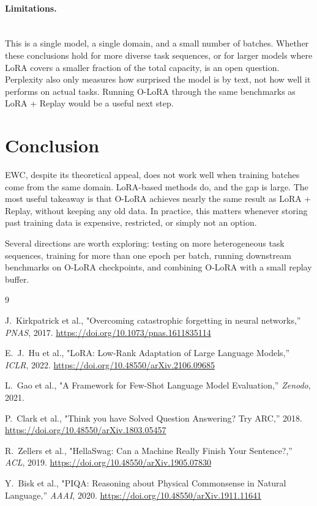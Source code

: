 \documentclass[11pt,a4paper]{article}
\begin{document}
\paragraph{Limitations.}\mbox{}\\
This is a single model, a single domain, and a small number of batches. Whether these conclusions hold for more diverse task sequences, or for larger models where LoRA covers a smaller fraction of the total capacity, is an open question. Perplexity also only measures how surprised the model is by text, not how well it performs on actual tasks. Running O-LoRA through the same benchmarks as LoRA + Replay would be a useful next step.

\section{Conclusion}

EWC, despite its theoretical appeal, does not work well when training batches come from the same domain. 
LoRA-based methods do, and the gap is large. The most useful takeaway is that O-LoRA achieves nearly the same result as LoRA + Replay, without keeping any old data. 
In practice, this matters whenever storing past training data is expensive, restricted, or simply not an option.

Several directions are worth exploring: testing on more heterogeneous task sequences, training for more than one epoch per batch, running downstream benchmarks on O-LoRA checkpoints, and combining O-LoRA with a small replay buffer.

\begin{thebibliography}{9}

J.\ Kirkpatrick et al., "Overcoming catastrophic forgetting in neural networks,'' \textit{PNAS}, 2017.
\url{https://doi.org/10.1073/pnas.1611835114}

E.\ J.\ Hu et al., "LoRA: Low-Rank Adaptation of Large Language Models,'' \textit{ICLR}, 2022.
\url{https://doi.org/10.48550/arXiv.2106.09685}

L.\ Gao et al., "A Framework for Few-Shot Language Model Evaluation,'' \textit{Zenodo}, 2021.

P.\ Clark et al., "Think you have Solved Question Answering? Try ARC,'' 2018.
\url{https://doi.org/10.48550/arXiv.1803.05457}

R.\ Zellers et al., "HellaSwag: Can a Machine Really Finish Your Sentence?,'' \textit{ACL}, 2019.
\url{https://doi.org/10.48550/arXiv.1905.07830}

Y.\ Bisk et al., "PIQA: Reasoning about Physical Commonsense in Natural Language,'' \textit{AAAI}, 2020.
\url{https://doi.org/10.48550/arXiv.1911.11641}
\end{thebibliography}
\end{document}
